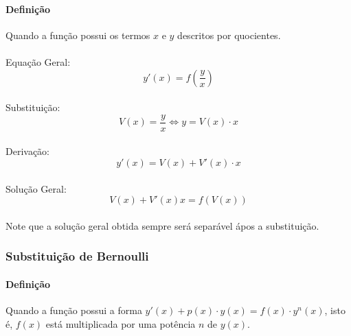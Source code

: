 \documentclass{article}
\begin{document}
                \paragraph{Definição}Quando a função possui os termos $x$ e $y$ descritos por quocientes.
                \paragraph{}Equação Geral:
                    \begin{equation}
                        y'(x)=f(\frac{y}{x})
                    \end{equation}
                \paragraph{}Substituição:
                    \begin{equation}
                        V(x)=\frac{y}{x} \Leftrightarrow y=V(x) \cdot x
                    \end{equation}
                \paragraph{}Derivação:
                    \begin{equation}
                        y'(x)=V(x)+V'(x) \cdot x
                    \end{equation}
                \paragraph{}Solução Geral:
                    \begin{equation}
                        V(x)+V'(x)x=f(V(x))
                    \end{equation}
                \paragraph{}Note que a solução geral obtida sempre será separável ápos a substituição.

            \subsubsection{Substituição de Bernoulli}
                \paragraph{Definição}Quando a função possui a forma $y'(x)+p(x) \cdot y(x)=f(x) \cdot y^{n}(x)$, isto 
                é, $f(x)$ está multiplicada por uma potência $n$ de $y(x)$.
\end{document}
